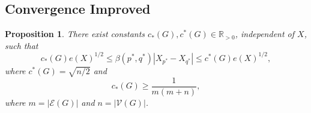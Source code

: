 \documentclass{article}
\newtheorem{proposition}{Proposition}
\theoremstyle{remark}
\newcommand{\R}[0]{\mathbb{R}}
\begin{document}
\subsection{Convergence Improved}

\begin{proposition}{\label{proposition:errorUpdateEquivalenceImproved}}
        There exist constants $c_*(G),c^*(G)\in\R_{>0}$, independent of $X$, such that
        \begin{equation}
		c_*(G)e(X)^{1/2} \leq \beta(p^*,q^*)|X_{p^*}-X_{q^*}| \leq c^*(G)e(X)^{1/2},
        \end{equation}
where $c^*(G) = \sqrt{n/2}$ and 
	\begin{equation}
		c_*(G) \geq \frac{1}{m(m+n)},
	\end{equation}
	where $m=|\mathcal{E}(G)|$ and $n=|\mathcal{V}(G)|$.
\end{proposition}
\end{document}
